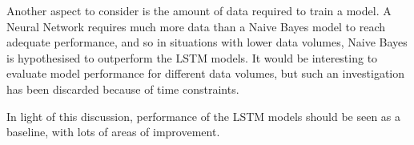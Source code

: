 Another aspect to consider is the amount of data required to train a
model. A Neural Network requires much more data than a Naive Bayes
model to reach adequate performance, and so in situations with lower
data volumes, Naive Bayes is hypothesised to outperform the LSTM
models. It would be interesting to evaluate model performance for
different data volumes, but such an investigation has been discarded
because of time constraints. 

In light of this discussion, performance of the LSTM models should be
seen as a baseline, with lots of areas of improvement.